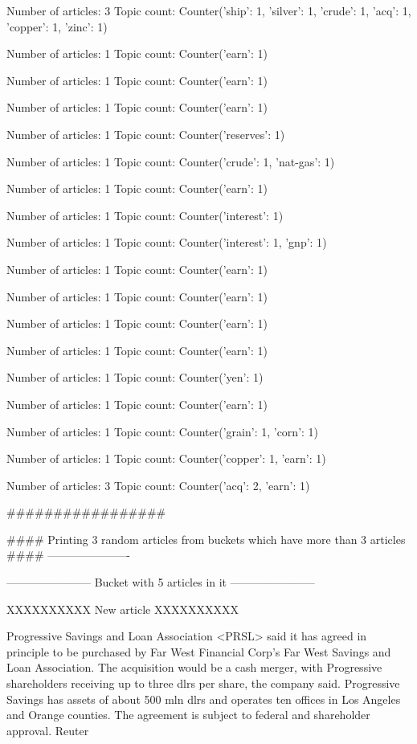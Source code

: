 \documentclass{article}
\begin{document}
\begin{pythonOutput}
Number of articles: 3
Topic count: Counter({'ship': 1, 'silver': 1, 'crude': 1, 'acq': 1, 'copper': 1, 'zinc': 1})

Number of articles: 1
Topic count: Counter({'earn': 1})

Number of articles: 1
Topic count: Counter({'earn': 1})

Number of articles: 1
Topic count: Counter({'earn': 1})

Number of articles: 1
Topic count: Counter({'reserves': 1})

Number of articles: 1
Topic count: Counter({'crude': 1, 'nat-gas': 1})

Number of articles: 1
Topic count: Counter({'earn': 1})

Number of articles: 1
Topic count: Counter({'interest': 1})

Number of articles: 1
Topic count: Counter({'interest': 1, 'gnp': 1})

Number of articles: 1
Topic count: Counter({'earn': 1})

Number of articles: 1
Topic count: Counter({'earn': 1})

Number of articles: 1
Topic count: Counter({'earn': 1})

Number of articles: 1
Topic count: Counter({'earn': 1})

Number of articles: 1
Topic count: Counter({'yen': 1})

Number of articles: 1
Topic count: Counter({'earn': 1})

Number of articles: 1
Topic count: Counter({'grain': 1, 'corn': 1})

Number of articles: 1
Topic count: Counter({'copper': 1, 'earn': 1})

Number of articles: 3
Topic count: Counter({'acq': 2, 'earn': 1})

#################

#### Printing 3 random articles from buckets which have more than 3 articles ####
----------------------

-----------------------
Bucket with 5 articles in it
-----------------------


XXXXXXXXXX
New article
XXXXXXXXXX

Progressive Savings and Loan
Association <PRSL> said it has agreed in principle to be
purchased by Far West Financial Corp's Far West Savings and
Loan Association.
    The acquisition would be a cash merger, with Progressive
shareholders receiving up to three dlrs per share, the company
said.
    Progressive Savings has assets of about 500 mln dlrs and
operates ten offices in Los Angeles and Orange counties.
    The agreement is subject to federal and shareholder
approval.
 Reuter


\end{pythonOutput}
\end{document}
